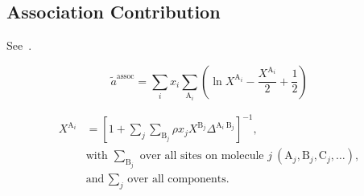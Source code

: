 \documentclass[12pt, letterpaper]{article}
\begin{document}
\subsection{Association Contribution}

See~\cite{Chapman1990}.

\begin{equation}
    \tilde{a}^{\mathrm{assoc}}= \sum_{i} x_{i}\sum_{\mathrm{A}_{i}}\left(\ln X^{\mathrm{A}_{i}}-\frac{X^{\mathrm{A}_{i}}}{2}+\frac{1}{2}\right)
    \label{eq:ares_assoc}
\end{equation}


\begin{equation}
    \begin{aligned}
        X^{\mathrm{A}_{i}}
        &=\left[1+ \sum_{j} \sum_{\mathrm{B}_{j}} \rho x_{j}X^{\mathrm{B}_{j}} \Delta^{\mathrm{A}_{i} \mathrm{~B}_{j}}\right]^{-1},
        \\
        &\text{with }\sum_{\mathrm{B}_{j}}\text{ over all sites on molecule }j\ (\mathrm{A}_{j},\mathrm{B}_{j},\mathrm{C}_{j},\ldots),
        \\
        &\text{and }\sum_{j}\text{ over all components.}
    \end{aligned}
    \label{eq:x_assoc_site}
\end{equation}

\end{document}
